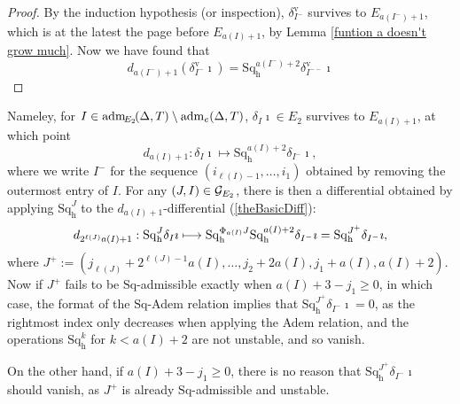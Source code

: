 \documentclass[11pt]{amsart} \renewcommand{\baselinestretch}{1.2}
\theoremstyle{plain}
\numberwithin{equation}{section} %
\theoremstyle{plain}
\numberwithin{equation}{chapter} %
\newcommand{\calg}{\mathcal{G}}
\newcommand{\Sq}{\mathrm{Sq}}
\newcommand{\aDTEtwo}{\mathrm{adm}_{\!\smash{E_2}\!}(\Delta,T)}
\newcommand{\calgEtwo}{\calg_{\smash{E_2}}}
\newcommand{\aDTe}{\mathrm{adm}_{\smash{e}}(\Delta,T)}
\newcommand{\uver}{^\mathrm{v}}
\newcommand{\dhor}{_\mathrm{h}}
\newcommand{\Sqh}{\mathrm{Sq}\dhor}
\newcommand{\deltav}{\delta\uver}
\renewcommand{\mapsto}{\longmapsto}
\begin{document}
\begin{The Bousfield-Kan spectral sequence for a sphere}
\begin{proof}

By the induction hypothesis (or inspection), $\deltav_{I^-}$ survives to $E_{a(I^-)+1}$, which is at the latest the page before $E_{a(I)+1}$, by Lemma \ref{funtion a doesn't grow much}. Now we have found that 
\[d_{a(I^-)+1}(\deltav_{I^-}\imath)=\Sqh^{a(I^-)+2}\deltav_{I^{--}}\imath\]

\end{proof}
 Nameley, for  $I\in \aDTEtwo \setminus\aDTe$, $\delta_I\imath\in E_2$  survives to $E_{a(I)+1}$, at which point
\begin{equation}\label{theBasicDiff}
d_{a(I)+1}:\delta_I\imath\mapsto\Sqh^{a(I)+2}\delta_{I^{-}}\imath,
\end{equation}
where we write $I^-$ for the sequence $(i_{\ell(I)-1},\ldots,i_1)$ obtained by removing the outermost entry of $I$. For any $(J,I)\in \calgEtwo$, there is then a differential 
obtained by applying $\Sqh^J$ to the $d_{a(I)+1}$-differential (\ref{theBasicDiff}):
\[d_{2^{\ell (J)}a(I)+1}:\Sqh^J\delta_I\imath \mapsto  \Sqh^{\Phi_{\smash{a(I)}}J}\Sqh^{a(I)+2}\delta_{I^{-}}\imath= \Sqh^{J^{+}}\delta_{I^{-}}\imath ,\]
where $J^+:= (j_{\ell(J)}+2^{\ell(J)-1}a(I),\ldots,j_2+2a(I),j_1+a(I),a(I)+2)$.
Now if $J^+$ fails to be $\Sq$-admissible  exactly when $a(I)+3-j_1\geq0$, in which case,  the format of the $\Sq$-Adem relation implies that $\Sqh^{J^{+}}\delta_{I^{-}}\imath=0$, as the rightmost index only decreases when applying the Adem relation, and the operations $\Sqh^{k}$ for $k<a(I)+2$ are not unstable, and so vanish.

On the other hand, if $a(I)+3-j_1\geq0$, there is no reason that $\Sqh^{J^{+}}\delta_{I^{-}}\imath$ should vanish, as $J^+$ is already $\Sq$-admissible and unstable.



\end{The Bousfield-Kan spectral sequence for a sphere}
\end{document}
